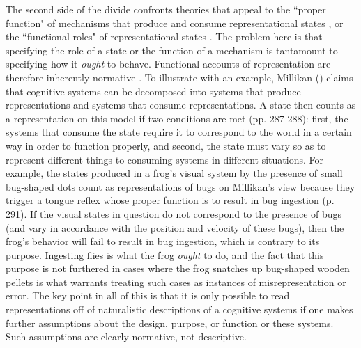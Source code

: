 The second side of the divide confronts theories that appeal to the ``proper function" of mechanisms that produce and consume representational states \citep{Millikan:1989,Millikan:2005,Dretske:1986}, or the ``functional roles" of representational states \citep{Block:1986,Harman:1982,Eliasmith:2000}. The problem here is that specifying the role of a state or the function of a mechanism is tantamount to specifying how it \textit{ought} to behave. Functional accounts of representation are therefore inherently normative \citep{Brandom:1994}. To illustrate with an example, Millikan (\citeyear{Millikan:1989}) claims that cognitive systems can be decomposed into systems that produce representations and systems that consume representations. A state then counts as a representation on this model if two conditions are met (pp. 287-288): first, the systems that consume the state require it to correspond to the world in a certain way in order to function properly, and second, the state must vary so as to represent different things to consuming systems in different situations. For example, the states produced in a frog's visual system by the presence of small bug-shaped dots count as representations of bugs on Millikan's view because they trigger a tongue reflex whose proper function is to result in bug ingestion (p. 291). If the visual states in question do not correspond to the presence of bugs (and vary in accordance with the position and velocity of these bugs), then the frog's behavior will fail to result in bug ingestion, which is contrary to its purpose. Ingesting flies is what the frog \textit{ought} to do, and the fact that this purpose is not furthered in cases where the frog snatches up bug-shaped wooden pellets is what warrants treating such cases as instances of misrepresentation or error. The key point in all of this is that it is only possible to read representations off of naturalistic descriptions of a cognitive systems if one makes further assumptions about the design, purpose, or function or these systems. Such assumptions are clearly normative, not descriptive.

